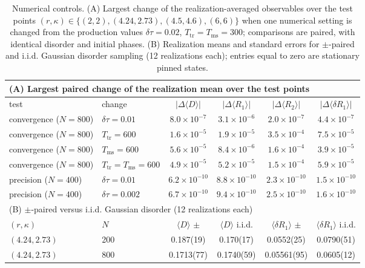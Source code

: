 \begin{table}
\caption{Numerical controls. (A) Largest change of the realization-averaged observables over the test points $(r,\kappa)\in\{(2,2), (4.24,2.73), (4.5,4.6), (6,6)\}$ when one numerical setting is changed from the production values $\delta\tau=0.02$, $T_{\mathrm{tr}}=T_{\mathrm{ms}}=300$; comparisons are paired, with identical disorder and initial phases. (B) Realization means and standard errors for $\pm$-paired and i.i.d. Gaussian disorder sampling (12 realizations each); entries equal to zero are stationary pinned states.}
\label{tab:controls}
\centering
\scriptsize
\setlength{\tabcolsep}{3pt}
\begin{tabular}{llcccc}
\hline\hline
\multicolumn{6}{l}{(A) Largest paired change of the realization mean over the test points} \\
\hline
test & change & $|\Delta\langle D\rangle|$ & $|\Delta\langle R_1\rangle|$ & $|\Delta\langle R_2\rangle|$ & $|\Delta\langle\delta R_1\rangle|$ \\
\hline
convergence ($N=800$) & $\delta\tau=0.01$ & $8.0\times10^{-7}$ & $3.1\times10^{-6}$ & $2.0\times10^{-7}$ & $4.4\times10^{-7}$ \\
convergence ($N=800$) & $T_{\mathrm{tr}}=600$ & $1.6\times10^{-5}$ & $1.9\times10^{-5}$ & $3.5\times10^{-4}$ & $7.5\times10^{-5}$ \\
convergence ($N=800$) & $T_{\mathrm{ms}}=600$ & $5.6\times10^{-5}$ & $8.4\times10^{-6}$ & $1.6\times10^{-4}$ & $3.9\times10^{-5}$ \\
convergence ($N=800$) & $T_{\mathrm{tr}}=T_{\mathrm{ms}}=600$ & $4.9\times10^{-5}$ & $5.2\times10^{-5}$ & $1.5\times10^{-4}$ & $5.9\times10^{-5}$ \\
precision ($N=400$) & $\delta\tau=0.01$ & $6.2\times10^{-10}$ & $8.8\times10^{-10}$ & $2.3\times10^{-10}$ & $1.5\times10^{-10}$ \\
precision ($N=400$) & $\delta\tau=0.002$ & $6.7\times10^{-10}$ & $9.4\times10^{-10}$ & $2.5\times10^{-10}$ & $1.6\times10^{-10}$ \\
\hline
\multicolumn{6}{l}{(B) $\pm$-paired versus i.i.d. Gaussian disorder (12 realizations each)} \\
\hline
$(r,\kappa)$ & $N$ & $\langle D\rangle$ $\pm$ & $\langle D\rangle$ i.i.d. & $\langle\delta R_1\rangle$ $\pm$ & $\langle\delta R_1\rangle$ i.i.d. \\
\hline
$(4.24,2.73)$ & 200 & 0.187(19) & 0.170(17) & 0.0552(25) & 0.0790(51) \\
$(4.24,2.73)$ & 800 & 0.1713(77) & 0.1740(59) & 0.05561(95) & 0.0605(12) \\

\end{tabular}
\end{table}
